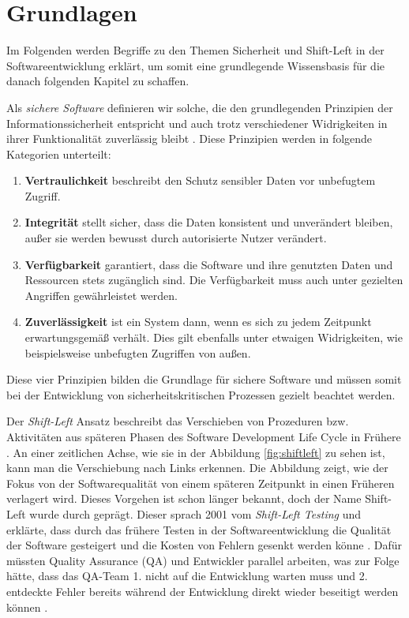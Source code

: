 \section{Grundlagen}

Im Folgenden werden Begriffe zu den Themen Sicherheit und Shift-Left in der Softwareentwicklung erklärt, um somit eine grundlegende Wissensbasis für die danach folgenden Kapitel zu schaffen.

Als \textit{sichere Software} definieren wir solche, die den grundlegenden Prinzipien der Informationssicherheit \cite{blakley_information_2001} entspricht und auch trotz verschiedener Widrigkeiten in ihrer Funktionalität zuverlässig bleibt \cite{oueslati_literature_2015}. Diese Prinzipien werden in folgende Kategorien unterteilt:
\begin{enumerate}
    \item \textbf{Vertraulichkeit} beschreibt den Schutz sensibler Daten vor unbefugtem Zugriff.
    \item \textbf{Integrität} stellt sicher, dass die Daten konsistent und unverändert bleiben, außer sie werden bewusst durch autorisierte Nutzer verändert.
    \item \textbf{Verfügbarkeit} garantiert, dass die Software und ihre genutzten Daten und Ressourcen stets zugänglich sind. Die Verfügbarkeit muss auch unter gezielten Angriffen gewährleistet werden.
    \item \textbf{Zuverlässigkeit} ist ein System dann, wenn es sich zu jedem Zeitpunkt erwartungsgemäß verhält. Dies gilt ebenfalls unter etwaigen Widrigkeiten, wie beispielsweise unbefugten Zugriffen von außen.
\end{enumerate}
Diese vier Prinzipien bilden die Grundlage für sichere Software und müssen somit bei der Entwicklung von sicherheitskritischen Prozessen gezielt beachtet werden.\

Der \textit{Shift-Left} Ansatz beschreibt das Verschieben von Prozeduren bzw. Aktivitäten aus späteren Phasen des Software Development Life Cycle in Frühere \cite{andriadi_impact_2023}. An einer zeitlichen Achse, wie sie in der Abbildung \ref{fig:shiftleft} zu sehen ist, kann man die Verschiebung nach Links erkennen. Die Abbildung zeigt, wie der Fokus von der Softwarequalität von einem späteren Zeitpunkt in einen Früheren verlagert wird. Dieses Vorgehen ist schon länger bekannt, doch der Name Shift-Left wurde durch \textcite{smith_shift-left_2001} geprägt. Dieser sprach 2001 vom \textit{Shift-Left Testing} und erklärte, dass durch das frühere Testen in der Softwareentwicklung die Qualität der Software gesteigert und die Kosten von Fehlern gesenkt werden könne \cite{dawoud_better_2024}. Dafür müssten Quality Assurance (QA) und Entwickler parallel arbeiten, was zur Folge hätte, dass das QA-Team 1. nicht auf die Entwicklung warten muss und 2. entdeckte Fehler bereits während der Entwicklung direkt wieder beseitigt werden können \cite{andriadi_impact_2023}. 

